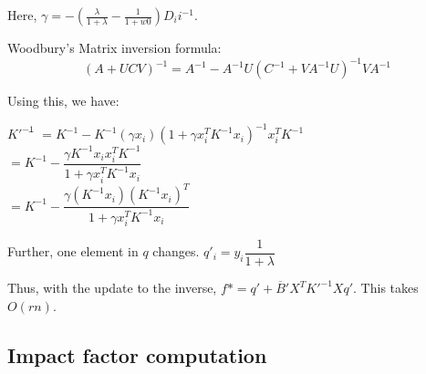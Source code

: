 \documentclass[12pt]{article}
\newcommand{\inv}[1]{#1^{-1}}
\begin{document}
Here, $\gamma = -(\frac{\lambda}{1+\lambda}-\frac{1}{1+w0})\inv{D_ii}$.

Woodbury's Matrix inversion formula: 
$$\inv{(A+UCV)} = \inv{A} - \inv{A}U\inv{(\inv{C}+V\inv{A}U)}V\inv{A}$$

Using this, we have:
\begin{tabbing}
$\inv{K'}$\= $= \inv{K} - \inv{K}(\gamma x_i)\inv{(1+ \gamma x_i^T\inv{K}x_i)}x_i^T\inv{K}$\\
\>$=\inv{K} - \dfrac{\gamma\inv{K}x_i x_i^T\inv{K}}{1+\gamma x_i^T \inv{K} x_i}$\\
\>$=\inv{K} - \dfrac{\gamma(\inv{K}x_i) (\inv{K}x_i)^T}{1+\gamma x_i^T \inv{K} x_i}$
\end{tabbing}

Further, one element in $q$ changes. $q'_i = y_i \dfrac{1}{1+\lambda}$

Thus, with the update to the inverse, $f* = q' + \overline{B}'X^T\inv{K'}Xq'$.
This takes $O(rn)$.

\subsection{Impact factor computation}
\end{document}
